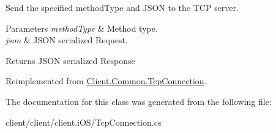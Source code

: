 Send the specified method\+Type and J\+S\+O\+N to the T\+C\+P server. 


\begin{DoxyParams}{Parameters}
{\em method\+Type} & Method type.\\
\hline
{\em json} & J\+S\+O\+N serialized Request.\\
\hline
\end{DoxyParams}
\begin{DoxyReturn}{Returns}
J\+S\+O\+N serialized Response
\end{DoxyReturn}


Reimplemented from \hyperlink{classClient_1_1Common_1_1TcpConnection_a2d0457442421976a677e6f24a14a92eb}{Client.\+Common.\+Tcp\+Connection}.



The documentation for this class was generated from the following file\+:\begin{DoxyCompactItemize}
\item 
client/client/client.\+i\+O\+S/Tcp\+Connection.\+cs\end{DoxyCompactItemize}
